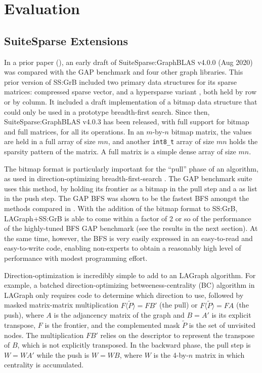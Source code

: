 \section{Evaluation}
\label{sec:evaluation}


\subsection{SuiteSparse Extensions}


In a prior paper (\cite{DBLP:conf/iiswc/AzadABBCDDDDFGG20}), an early draft of
SuiteSparse:GraphBLAS v4.0.0 (Aug 2020) was compared with the GAP benchmark
\cite{DBLP:conf/sc/BeamerAP12} and four other graph libraries.  This prior
version of SS:GrB included two primary data structures for its sparse matrices:
compressed sparse vector, and a hypersparse variant
\cite{DBLP:conf/ipps/BulucG08}, both held by row or by column.  It included a
draft implementation of a bitmap data structure that could only be used in a
prototype breadth-first search.  Since then, SuiteSparse:GraphBLAS v4.0.3 has
been released, with full support for bitmap and full matrices, for all its
operations.  In an $m$-by-$n$ bitmap matrix, the values are held in a full
array of size $mn$, and another \verb'int8_t' array of size $mn$ holds the
sparsity pattern of the matrix.  A full matrix is a simple dense array of size
$mn$.

The bitmap format is particularly important for the ``pull'' phase of an
algorithm, as used in direction-optimizing breadth-first-search
\cite{DBLP:conf/sc/BeamerAP12}.  The GAP benchmark suite uses this method, by
holding its frontier as a bitmap in the pull step and a as list in the push
step. The GAP BFS was shown to be the fastest BFS amongst the methods compared
in \cite{DBLP:conf/sc/BeamerAP12}.  With the addition of the bitmap format to
SS:GrB, LAGraph+SS:GrB is able to come within a factor of 2 or so of the
performance of the highly-tuned BFS GAP benchmark (see the results in the next
section).  At the same time, however, the BFS is very easily expressed in an
easy-to-read and easy-to-write code, enabling non-experts to obtain a
reasonably high level of performance with modest programming effort.


Direction-optimization is incredibly simple to add to an LAGraph algorithm.
For example, a batched direction-optimizing betweeness-centrality (BC)
algorithm in LAGraph only requires code to determine which direction to use,
followed by masked matrix-matrix multiplication $F \langle \tilde P \rangle
=FB'$ (the pull) or $F \langle \tilde P \rangle =FA$ (the push), where $A$ is
the adjancency matrix of the graph and $B=A'$ is its explicit transpose, $F$ is
the frontier, and the complemented mask $\tilde P$ is the set of unvisited
nodes.  The multiplication $FB'$ relies on the descriptor to represent the
transpose of $B$, which is not explicitly transposed.  In the backward phase,
the pull step is $W=WA'$ while the push is $W=WB$, where $W$ is the 4-by-$n$
matrix in which centrality is accumulated.

